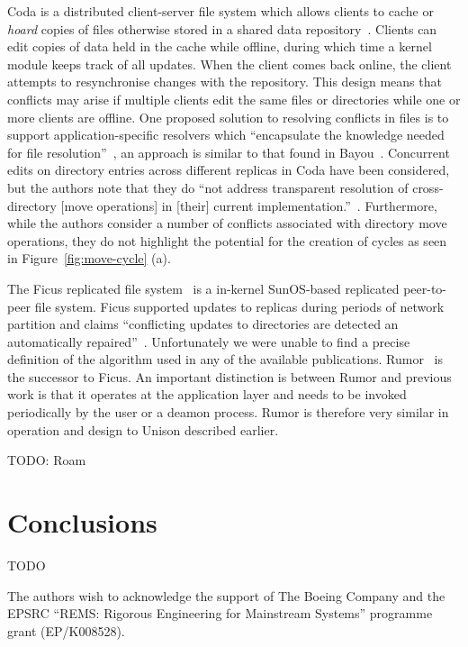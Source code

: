 \documentclass[sigconf]{acmart}
\begin{document}
Coda is a distributed client-server file system which allows clients to cache or \emph{hoard} copies of files otherwise stored in a shared data repository~\cite{kistler1992coda}. 
Clients can edit copies of data held in the cache while offline, during which time a kernel module keeps track of all updates. 
When the client comes back online, the client attempts to resynchronise changes with the repository. 
This design means that conflicts may arise if multiple clients edit the same files or directories while one or more clients are offline. 
One proposed solution to resolving conflicts in files is to support application-specific resolvers which ``encapsulate the knowledge needed for file resolution''~\cite{Kumar:1995wf}, an approach is similar to that found in Bayou~\cite{Terry:1995dn}.
Concurrent edits on directory entries across different replicas in Coda have been considered, but the authors note that they do ``not address transparent resolution of cross-directory [move operations] in [their] current implementation.''~\cite{kumar1993log}.
Furthermore, while the authors consider a number of conflicts associated with directory move operations, they do not highlight the potential for the creation of cycles as seen in Figure~\ref{fig:move-cycle} (a).

The Ficus replicated file system~\cite{Reiher:1994wh} is a in-kernel SunOS-based replicated peer-to-peer file system. 
Ficus supported updates to replicas during periods of network partition and claims ``conflicting updates to directories are detected an automatically repaired''~\cite{guy1990implementation}. 
Unfortunately we were unable to find a precise definition of the algorithm used in any of the available publications. 
Rumor~\cite{Guy:1999gy} is the successor to Ficus. 
An important distinction is between Rumor and previous work is that it operates at the application layer and needs to be invoked periodically by the user or a deamon process.
Rumor is therefore very similar in operation and design to Unison described earlier.


TODO: Roam~\cite{Ratner:1999fh}

\section{Conclusions}

TODO


\begin{acks}
The authors wish to acknowledge the support of The Boeing Company and the EPSRC ``REMS: Rigorous Engineering for Mainstream Systems'' programme grant (EP/K008528).
\end{acks}


{}
\end{document}
